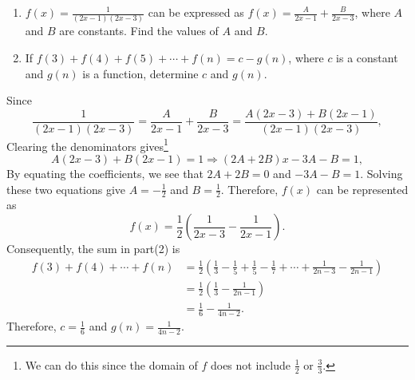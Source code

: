 \begin{question}
    \begin{enumerate}
        \item $f(x) = \frac{1}{(2x - 1)(2x - 3)}$ can be expressed as $f(x) =
            \frac{A}{2x - 1}+\frac{B}{2x - 3}$, where $A$ and $B$ are
            constants. Find the values of $A$ and $B$. 
        
        \item If $f(3) + f(4) + f(5) + \cdots + f(n) = c - g(n)$, where $c$ is
            a constant and $g(n)$ is a function, determine $c$ and $g(n)$. 
    \end{enumerate}
\end{question}
\begin{solution}
    Since 
    \[ \frac{1}{(2x - 1)(2x - 3)} = \frac{A}{2x - 1} + \frac{B}{2x - 3} =
    \frac{A(2x - 3) + B(2x - 1)}{(2x - 1)(2x - 3)}, \]
    Clearing the denominators gives\footnote{We can do this since the domain of
    $f$ does not include $\frac{1}{2}$ or $\frac{3}{3}$.}
    \[ A(2x - 3) + B(2x - 1) = 1 \Longrightarrow (2A + 2B)x - 3A - B = 1, \]
    By equating the coefficients, we see that $2A + 2B = 0$ and $-3A - B = 1$.
    Solving these two equations give $A = -\frac{1}{2}$ and $B = \frac{1}{2}$.
    Therefore, $f(x)$ can be represented as
    \[ f(x) = \frac{1}{2}\left( \frac{1}{2x - 3} - \frac{1}{2x - 1} \right). \]
    Consequently, the sum in part(2) is
    \begin{align*}
        f(3) + f(4) + \cdots + f(n)
        &= \frac{1}{2}\left( \frac{1}{3} - \frac{1}{5} + \frac{1}{5} - \frac{1}{7} + \cdots + \frac{1}{2n - 3} - \frac{1}{2n - 1} \right)\\
        &= \frac{1}{2}\left( \frac{1}{3} - \frac{1}{2n - 1} \right)\\
        &= \frac{1}{6} - \frac{1}{4n - 2}.
    \end{align*}
    Therefore, $c = \frac{1}{6}$ and $g(n) = \frac{1}{4n - 2}$.
\end{solution}

